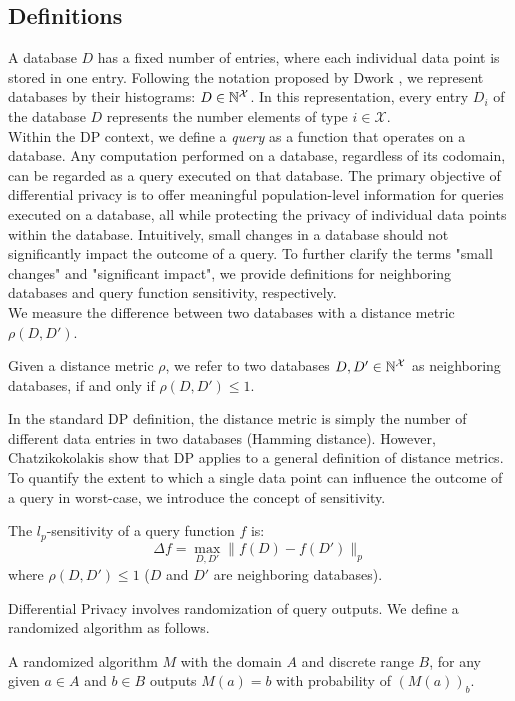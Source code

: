 \subsection{Definitions}
A database $D$ has a fixed number of entries, where each individual data point is stored in one entry.
Following the notation proposed by Dwork \etal \cite{dwork2014algorithmic}, we represent databases by their histograms: $D \in \mathbb{N}^\mathcal{X}$. 
In this representation, every entry $D_i$ of the database $D$ represents the number elements of type $i \in \mathcal{X}$.
\\  
Within the DP context, we define a \textit{query} as a function that operates on a database. 
Any computation performed on a database, regardless of its codomain, can be regarded as a query executed on that database.
The primary objective of differential privacy is to offer meaningful population-level information for queries executed on a database, all while protecting the privacy of individual data points within the database.
Intuitively, small changes in a database should not significantly impact the outcome of a query.
To further clarify the terms "small changes" and "significant impact", we provide definitions for neighboring databases and query function sensitivity, respectively.
\\
We measure the difference between two databases with a distance metric $\rho(D, D')$.
\begin{definition}
  Given a distance metric $\rho$, we refer to two databases $D, D' \in \mathbb{N}^\mathcal{X}$ as neighboring databases, if and only if $\rho(D, D') \leq 1$.             
\end{definition}
\noindent In the standard DP definition, the distance metric is simply the number of different data entries in two databases (\ie Hamming distance).
However, Chatzikokolakis \etal \cite{chatzikokolakis2013broadening} show that DP applies to a general definition of distance metrics.
\\
To quantify the extent to which a single data point can influence the outcome of a query in worst-case, we introduce the concept of sensitivity. 
\begin{definition}[$l_p$-Sensitivity]
  The $l_p$-sensitivity of a query function $f$ is:
  \begin{equation*}
    \Delta f = \max_{D, D'} \|f(D) - f(D')\|_p 
  \end{equation*}
where $\rho(D, D') \leq 1$ (\ie $D$ and $D'$ are neighboring databases).
\end{definition}
\noindent
Differential Privacy involves randomization of query outputs. We define a randomized algorithm as follows.
\begin{definition}
  A randomized algorithm $M$ with the domain $A$ and discrete range $B$, for any given $a \in A$ and $b \in B$ outputs $M(a)= b$ with probability of $(M(a))_b$.
\end{definition}

